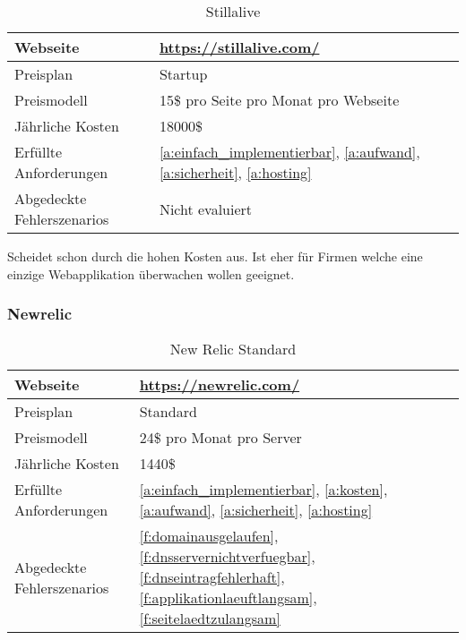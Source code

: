 \begin{table}[h!]
  \centering
  \begin{tabular}{p{5cm} p{7cm}}
  \toprule
    Webseite & \url{https://stillalive.com/}\\
  \hline
    Preisplan & Startup\\
  \hline
    Preismodell & 15\$ pro Seite pro Monat pro Webseite\\
  \hline
    Jährliche Kosten & 18000\$\\
  \hline
    Erfüllte Anforderungen & \ref{a:einfach_implementierbar}, \ref{a:aufwand}, \ref{a:sicherheit}, \ref{a:hosting}\\
  \hline
    Abgedeckte Fehlerszenarios & Nicht evaluiert\\
  \bottomrule
  \end{tabular}
  \caption{Stillalive}
  \label{tab:stillalive}
\end{table}

Scheidet schon durch die hohen Kosten aus. Ist eher für Firmen welche eine einzige Webapplikation überwachen wollen geeignet.

\subsubsection{Newrelic}
\label{ssub:newrelic}

\begin{table}[h!]
  \centering
  \begin{tabular}{p{5cm} p{7cm}}
  \toprule
    Webseite & \url{https://newrelic.com/}\\
  \hline
    Preisplan & Standard\\
  \hline
    Preismodell & 24\$ pro Monat pro Server\\
  \hline
    Jährliche Kosten & 1440\$\\
  \hline
    Erfüllte Anforderungen & \ref{a:einfach_implementierbar}, \ref{a:kosten}, \ref{a:aufwand}, \ref{a:sicherheit}, \ref{a:hosting}\\
  \hline
    Abgedeckte Fehlerszenarios & \ref{f:domainausgelaufen}, \ref{f:dnsservernichtverfuegbar}, \ref{f:dnseintragfehlerhaft}, \ref{f:applikationlaeuftlangsam}, \ref{f:seitelaedtzulangsam}\\
  \bottomrule
  \end{tabular}
  \caption{New Relic Standard}
  \label{tab:new_relic_standard}
\end{table}

